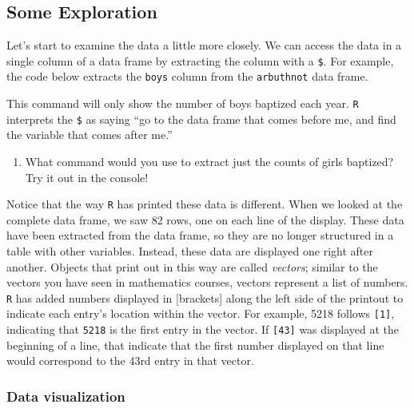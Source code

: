 \documentclass[
]{article}
\newenvironment{Shaded}{\begin{snugshade}}{\end{snugshade}}
\newcommand{\NormalTok}[1]{#1}
\newcommand{\SpecialCharTok}[1]{\textcolor[rgb]{0.00,0.00,0.00}{#1}}
\providecommand{\tightlist}{%
  \setlength{\itemsep}{0pt}\setlength{\parskip}{0pt}}
\begin{document}
\hypertarget{some-exploration}{%
\subsection{Some Exploration}\label{some-exploration}}

Let's start to examine the data a little more closely. We can access the data in a single column of a data frame by extracting the column with a \texttt{\$}. For example, the code below extracts the \texttt{boys} column from the \texttt{arbuthnot} data frame.

\begin{Shaded}
\end{Shaded}

This command will only show the number of boys baptized each year. \texttt{R} interprets the \texttt{\$} as saying ``go to the data frame that comes before me, and find the variable that comes after me.''

\begin{enumerate}
\def\labelenumi{\arabic{enumi}.}
\tightlist
\item
  What command would you use to extract just the counts of girls baptized? Try it out in the console!
\end{enumerate}

Notice that the way \texttt{R} has printed these data is different. When we looked at the complete data frame, we saw 82 rows, one on each line of the display. These data have been extracted from the data frame, so they are no longer structured in a table with other variables. Instead, these data are displayed one right after another. Objects that print out in this way are called \emph{vectors}; similar to the vectors you have seen in mathematics courses, vectors represent a list of numbers. \texttt{R} has added numbers displayed in {[}brackets{]} along the left side of the printout to indicate each entry's location within the vector. For example, 5218 follows \texttt{{[}1{]}}, indicating that \texttt{5218} is the first entry in the vector. If \texttt{{[}43{]}} was displayed at the beginning of a line, that indicate that the first number displayed on that line would correspond to the 43rd entry in that vector.

\hypertarget{data-visualization}{%
\subsubsection{Data visualization}\label{data-visualization}}
\end{document}
